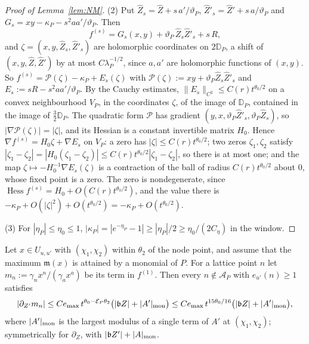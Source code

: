 \begin{proof}[Proof of Lemma~\ref{lem:NM}]
(2) Put $\hat Z_s=\hat Z+s\,a'/\vartheta_P$, $\hat Z'_s=\hat Z'+s\,a/\vartheta_P$ and $G_s=xy-\kappa_P-s^2aa'/\vartheta_P$.
Then
\[
f^{(s)}=G_s(x,y)+\vartheta_P\,\hat Z_s\hat Z'_s+s\,R ,
\]
and $\zeta=(x,y,\hat Z_s,\hat Z'_s)$ are holomorphic coordinates on $2\mathbb D_P$, a shift of $(x,y,\hat Z,\hat Z')$ by at most
$C\lambda_P^{-1/2}$, since $a,a'$ are holomorphic functions of $(x,y)$. So $f^{(s)}=\mathcal P(\zeta)-\kappa_P+E_s(\zeta)$ with
$\mathcal P(\zeta):=xy+\vartheta_P\hat Z_s\hat Z'_s$ and $E_s:=sR-s^2aa'/\vartheta_P$. By the Cauchy estimates,
$\|E_s\|_{C^2}\le C(r)t^{\theta_0/2}$ on a convex neighbourhood $V_P$, in the coordinates $\zeta$, of the image of
$\mathbb D_P$, contained in the image of $\tfrac32\mathbb D_P$. The quadratic form $\mathcal P$ has gradient
$(y,x,\vartheta_P\hat Z'_s,\vartheta_P\hat Z_s)$, so $|\nabla\mathcal P(\zeta)|=|\zeta|$, and its Hessian is a constant
invertible matrix $H_0$. Hence $\nabla f^{(s)}=H_0\zeta+\nabla E_s$ on $V_P$: a zero has $|\zeta|\le C(r)t^{\theta_0/2}$;
two zeros $\zeta_1,\zeta_2$ satisfy $|\zeta_1-\zeta_2|=|H_0(\zeta_1-\zeta_2)|\le C(r)t^{\theta_0/2}|\zeta_1-\zeta_2|$, so there
is at most one; and the map $\zeta\mapsto-H_0^{-1}\nabla E_s(\zeta)$ is a contraction of the ball of radius
$C(r)t^{\theta_0/2}$ about $0$, whose fixed point is a zero. The zero is nondegenerate, since
$\operatorname{Hess}f^{(s)}=H_0+O(C(r)t^{\theta_0/2})$, and the value there is
$-\kappa_P+O(|\zeta|^2)+O(t^{\theta_0/2})=-\kappa_P+O(t^{\theta_0/2})$.

(3) For $|\eta_P|\le\eta_0\le1$, $|\kappa_P|=|e^{-\eta_P}-1|\ge|\eta_P|/2\ge\eta_0/(2C_\eta)$ in the window.
\end{proof}

\begin{lemma}\label{lem:nodecomp}
Let $x\in U_{u,u'}$ with $(\chi_1,\chi_2)$ within $\theta_2$ of the node point, and assume that the maximum $\mathfrak m(x)$
is attained by a monomial of $P$. For a lattice point $n$ let $m_n:=\gamma_nx^n/(\gamma_ax^a)$ be its term in $f^{(1)}$.
Then every $n\notin\mathcal A_P$ with $e_{u'}(n)\ge1$ satisfies
\[
|\partial_{Z'}m_n|\le Ce_{\max}\,t^{\theta_0-\mathcal E_P\theta_2}\bigl(|\mathfrak bZ|+|A'|_{\rm mon}\bigr)\le
Ce_{\max}\,t^{15\theta_0/16}\bigl(|\mathfrak bZ|+|A'|_{\rm mon}\bigr),
\]
where $|A'|_{\rm mon}$ is the largest modulus of a single term of $A'$ at $(\chi_1,\chi_2)$; symmetrically for $\partial_Z$,
with $|\mathfrak bZ'|+|A|_{\rm mon}$.
\end{lemma}

